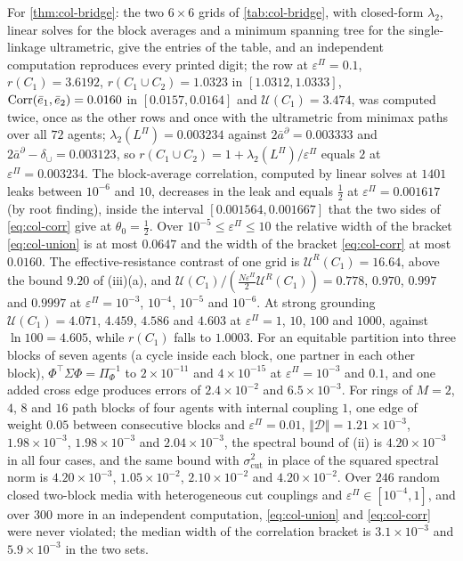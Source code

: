 \begin{numcheck}\label{chk:col-bridge}
For \cref{thm:col-bridge}: the two $6\times6$ grids of \cref{tab:col-bridge}, with closed-form $\lambda_2$, linear solves for the block averages and a minimum spanning tree for the single-linkage ultrametric, give the entries of the table, and an independent computation reproduces every printed digit; the row at $\varepsilon^\Pi=0.1$, $r(C_1)=3.6192$, $r(C_1\cup C_2)=1.0323$ in $[1.0312,1.0333]$, $\operatorname{Corr}(\bar e_1,\bar e_2)=0.0160$ in $[0.0157,0.0164]$ and $\mathcal U(C_1)=3.474$, was computed twice, once as the other rows and once with the ultrametric from minimax paths over all $72$ agents; $\lambda_2(L^\Pi)=0.003234$ against $2\bar a^\partial=0.003333$ and $2\bar a^\partial-\delta_\cup=0.003123$, so $r(C_1\cup C_2)=1+\lambda_2(L^\Pi)/\varepsilon^\Pi$ equals $2$ at $\varepsilon^\Pi=0.003234$. The block-average correlation, computed by linear solves at $1401$ leaks between $10^{-6}$ and $10$, decreases in the leak and equals $\frac12$ at $\varepsilon^\Pi=0.001617$ (by root finding), inside the interval $[0.001564,0.001667]$ that the two sides of \eqref{eq:col-corr} give at $\theta_0=\frac12$. Over $10^{-5}\le\varepsilon^\Pi\le10$ the relative width of the bracket \eqref{eq:col-union} is at most $0.0647$ and the width of the bracket \eqref{eq:col-corr} at most $0.0160$. The effective-resistance contrast of one grid is $\mathcal U^R(C_1)=16.64$, above the bound $9.20$ of (iii)(a), and $\mathcal U(C_1)/(\frac{N\varepsilon^\Pi}2\mathcal U^R(C_1))=0.778$, $0.970$, $0.997$ and $0.9997$ at $\varepsilon^\Pi=10^{-3}$, $10^{-4}$, $10^{-5}$ and $10^{-6}$. At strong grounding $\mathcal U(C_1)=4.071$, $4.459$, $4.586$ and $4.603$ at $\varepsilon^\Pi=1$, $10$, $100$ and $1000$, against $\ln100=4.605$, while $r(C_1)$ falls to $1.0003$. For an equitable partition into three blocks of seven agents (a cycle inside each block, one partner in each other block), $\Phi^\top\Sigma\Phi=\Pi_\Phi^{-1}$ to $2\times10^{-11}$ and $4\times10^{-15}$ at $\varepsilon^\Pi=10^{-3}$ and $0.1$, and one added cross edge produces errors of $2.4\times10^{-2}$ and $6.5\times10^{-3}$. For rings of $M=2$, $4$, $8$ and $16$ path blocks of four agents with internal coupling $1$, one edge of weight $0.05$ between consecutive blocks and $\varepsilon^\Pi=0.01$, $\Vert\mathcal D\Vert=1.21\times10^{-3}$, $1.98\times10^{-3}$, $1.98\times10^{-3}$ and $2.04\times10^{-3}$, the spectral bound of (ii) is $4.20\times10^{-3}$ in all four cases, and the same bound with $\sigma^2_{\mathrm{cut}}$ in place of the squared spectral norm is $4.20\times10^{-3}$, $1.05\times10^{-2}$, $2.10\times10^{-2}$ and $4.20\times10^{-2}$. Over $246$ random closed two-block media with heterogeneous cut couplings and $\varepsilon^\Pi\in[10^{-4},1]$, and over $300$ more in an independent computation, \eqref{eq:col-union} and \eqref{eq:col-corr} were never violated; the median width of the correlation bracket is $3.1\times10^{-3}$ and $5.9\times10^{-3}$ in the two sets.
\end{numcheck}
